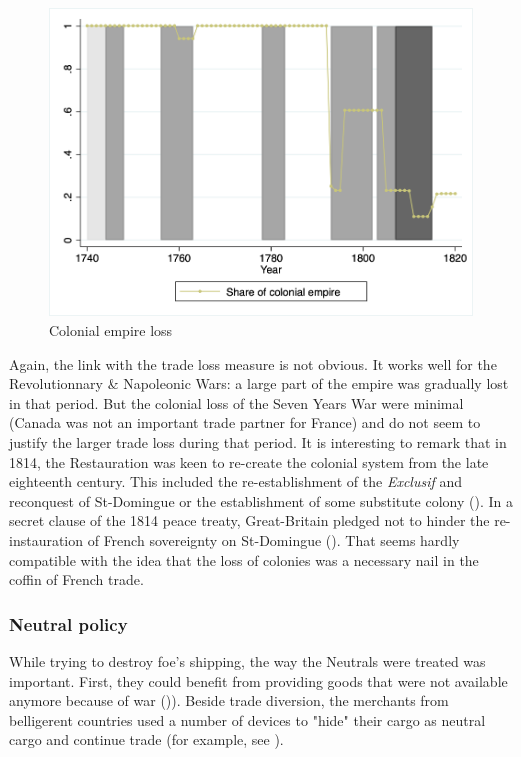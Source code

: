 \documentclass[12pt,a4paper,notitlepage,english]{article}
\begin{document}
\begin{center}
\begin{figure}[H]
\caption{Colonial empire loss}
\label{colony_loss}
\centering
\includegraphics[scale=.51]{colony_loss.png}
\end{figure}
\end{center}
Again, the link with the trade loss measure is not obvious. It works well for the Revolutionnary \& Napoleonic Wars: a large part of the empire was gradually lost in that period. But the colonial loss of the Seven Years War were minimal (Canada was not an important trade partner for France) and do not seem to justify the larger trade loss during that period.
It is interesting to remark that in 1814, the Restauration was keen to re-create the colonial system from the late eighteenth century.
This included the re-establishment of the \textit{Exclusif} and reconquest of St-Domingue or the establishment of some substitute colony (\cite{Todd2011}).
In a secret clause of the 1814 peace treaty, Great-Britain pledged not to hinder the re-instauration of French sovereignty on St-Domingue (\cite{Schefer1907}).
That seems hardly compatible with the idea that the loss of colonies was a necessary nail in the coffin of French trade.

\subsubsection{Neutral policy}
While trying to destroy foe's shipping, the way the Neutrals were treated was important. First, they could benefit from providing goods that were not available anymore because of war ()\cite{Hedberg2015}). Beside trade diversion, the merchants from belligerent countries used a number of devices to "hide" their cargo as neutral cargo and continue trade (for example, see \cite{Carriere1973,Schnakenbourg2013,Schnakenbourg2015}).
\end{document}
